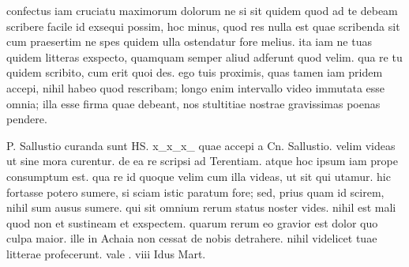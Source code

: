 


 confectus iam cruciatu maximorum dolorum ne si sit quidem quod ad te debeam scribere facile id exsequi possim, hoc minus, quod res nulla est quae scribenda sit cum praesertim ne spes quidem ulla ostendatur fore melius. ita iam ne tuas quidem litteras exspecto, quamquam semper aliud adferunt quod velim. qua re tu quidem scribito, cum erit quoi des. ego tuis proximis, quas tamen iam pridem accepi, nihil habeo quod rescribam; longo enim intervallo video immutata esse omnia; illa esse firma quae debeant, nos stultitiae nostrae gravissimas poenas pendere.

 P. Sallustio curanda sunt HS. x_x_x_ quae accepi a Cn. Sallustio. velim videas ut sine mora curentur. de ea re scripsi ad Terentiam. atque hoc ipsum iam prope consumptum est. qua re id quoque velim cum illa videas, ut sit qui utamur. hic fortasse potero sumere, si sciam istic paratum fore; sed, prius quam id scirem, nihil sum ausus sumere. qui sit omnium rerum status noster vides. nihil est mali quod non et sustineam et exspectem. quarum rerum eo gravior est dolor quo culpa maior. ille in Achaia non cessat de nobis detrahere. nihil videlicet tuae litterae profecerunt. vale . viii Idus Mart.
